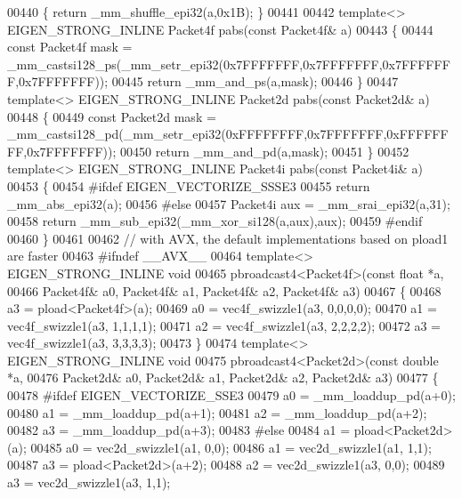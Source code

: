 \begin{DoxyCode}
00440 \{ \textcolor{keywordflow}{return} \_mm\_shuffle\_epi32(a,0x1B); \}
00441 
00442 \textcolor{keyword}{template}<> EIGEN\_STRONG\_INLINE Packet4f pabs(\textcolor{keyword}{const} Packet4f& a)
00443 \{
00444   \textcolor{keyword}{const} Packet4f mask = \_mm\_castsi128\_ps(\_mm\_setr\_epi32(0x7FFFFFFF,0x7FFFFFFF,0x7FFFFFFF,0x7FFFFFFF));
00445   \textcolor{keywordflow}{return} \_mm\_and\_ps(a,mask);
00446 \}
00447 \textcolor{keyword}{template}<> EIGEN\_STRONG\_INLINE Packet2d pabs(\textcolor{keyword}{const} Packet2d& a)
00448 \{
00449   \textcolor{keyword}{const} Packet2d mask = \_mm\_castsi128\_pd(\_mm\_setr\_epi32(0xFFFFFFFF,0x7FFFFFFF,0xFFFFFFFF,0x7FFFFFFF));
00450   \textcolor{keywordflow}{return} \_mm\_and\_pd(a,mask);
00451 \}
00452 \textcolor{keyword}{template}<> EIGEN\_STRONG\_INLINE Packet4i pabs(\textcolor{keyword}{const} Packet4i& a)
00453 \{
00454 \textcolor{preprocessor}{  #ifdef EIGEN\_VECTORIZE\_SSSE3}
00455   \textcolor{keywordflow}{return} \_mm\_abs\_epi32(a);
00456 \textcolor{preprocessor}{  #else}
00457   Packet4i aux = \_mm\_srai\_epi32(a,31);
00458   \textcolor{keywordflow}{return} \_mm\_sub\_epi32(\_mm\_xor\_si128(a,aux),aux);
00459 \textcolor{preprocessor}{  #endif}
00460 \}
00461 
00462 \textcolor{comment}{// with AVX, the default implementations based on pload1 are faster}
00463 \textcolor{preprocessor}{#ifndef \_\_AVX\_\_}
00464 \textcolor{keyword}{template}<> EIGEN\_STRONG\_INLINE \textcolor{keywordtype}{void}
00465 pbroadcast4<Packet4f>(\textcolor{keyword}{const} \textcolor{keywordtype}{float} *a,
00466                       Packet4f& a0, Packet4f& a1, Packet4f& a2, Packet4f& a3)
00467 \{
00468   a3 = pload<Packet4f>(a);
00469   a0 = vec4f\_swizzle1(a3, 0,0,0,0);
00470   a1 = vec4f\_swizzle1(a3, 1,1,1,1);
00471   a2 = vec4f\_swizzle1(a3, 2,2,2,2);
00472   a3 = vec4f\_swizzle1(a3, 3,3,3,3);
00473 \}
00474 \textcolor{keyword}{template}<> EIGEN\_STRONG\_INLINE \textcolor{keywordtype}{void}
00475 pbroadcast4<Packet2d>(\textcolor{keyword}{const} \textcolor{keywordtype}{double} *a,
00476                       Packet2d& a0, Packet2d& a1, Packet2d& a2, Packet2d& a3)
00477 \{
00478 \textcolor{preprocessor}{#ifdef EIGEN\_VECTORIZE\_SSE3}
00479   a0 = \_mm\_loaddup\_pd(a+0);
00480   a1 = \_mm\_loaddup\_pd(a+1);
00481   a2 = \_mm\_loaddup\_pd(a+2);
00482   a3 = \_mm\_loaddup\_pd(a+3);
00483 \textcolor{preprocessor}{#else}
00484   a1 = pload<Packet2d>(a);
00485   a0 = vec2d\_swizzle1(a1, 0,0);
00486   a1 = vec2d\_swizzle1(a1, 1,1);
00487   a3 = pload<Packet2d>(a+2);
00488   a2 = vec2d\_swizzle1(a3, 0,0);
00489   a3 = vec2d\_swizzle1(a3, 1,1);

\end{DoxyCode}
